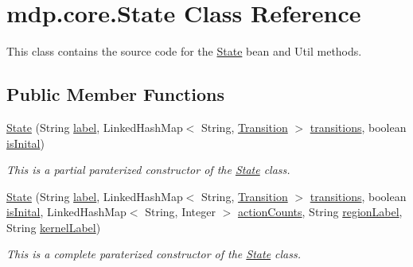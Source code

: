 \hypertarget{classmdp_1_1core_1_1_state}{}\section{mdp.\+core.\+State Class Reference}
\label{classmdp_1_1core_1_1_state}


This class contains the source code for the \hyperlink{classmdp_1_1core_1_1_state}{State} bean and Util methods.  


\subsection*{Public Member Functions}
\begin{DoxyCompactItemize}
\item 
\hyperlink{classmdp_1_1core_1_1_state_ab15662127acf94e1bd1b6890310568e7}{State} (String \hyperlink{classmdp_1_1core_1_1_state_a40b54cc46e175c748d5ce129aba70633}{label}, Linked\+Hash\+Map$<$ String, \hyperlink{classmdp_1_1core_1_1_transition}{Transition} $>$ \hyperlink{classmdp_1_1core_1_1_state_a3c9b563199f7e235fe083b0d16da8cf3}{transitions}, boolean \hyperlink{classmdp_1_1core_1_1_state_a06eb4d38e11e4be71c5e072fe9f9bee3}{is\+Inital})
\begin{DoxyCompactList}\small\item\em This is a partial paraterized constructor of the \hyperlink{classmdp_1_1core_1_1_state}{State} class. \end{DoxyCompactList}\item 
\hyperlink{classmdp_1_1core_1_1_state_aee42d71447b8e1df2417e335ef3be5fd}{State} (String \hyperlink{classmdp_1_1core_1_1_state_a40b54cc46e175c748d5ce129aba70633}{label}, Linked\+Hash\+Map$<$ String, \hyperlink{classmdp_1_1core_1_1_transition}{Transition} $>$ \hyperlink{classmdp_1_1core_1_1_state_a3c9b563199f7e235fe083b0d16da8cf3}{transitions}, boolean \hyperlink{classmdp_1_1core_1_1_state_a06eb4d38e11e4be71c5e072fe9f9bee3}{is\+Inital}, Linked\+Hash\+Map$<$ String, Integer $>$ \hyperlink{classmdp_1_1core_1_1_state_a56e17de2fde7a7f4ee8b1491c11438d5}{action\+Counts}, String \hyperlink{classmdp_1_1core_1_1_state_aa6f24dca5cb78d028e99f69b9e6ccb2c}{region\+Label}, String \hyperlink{classmdp_1_1core_1_1_state_ac7ca184df7a0ec4141766692290c18ab}{kernel\+Label})
\begin{DoxyCompactList}\small\item\em This is a complete paraterized constructor of the \hyperlink{classmdp_1_1core_1_1_state}{State} class. \end{DoxyCompactList}\item 

\end{DoxyCompactItemize}

